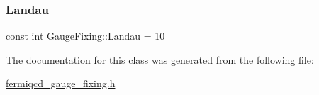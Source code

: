 \mbox{\label{class_gauge_fixing_a115e0b47731237fd9ff984c7f6881994}} 
\subsubsection{\texorpdfstring{Landau}{Landau}}
{\footnotesize\ttfamily const int Gauge\+Fixing\+::\+Landau = 10\hspace{0.3cm}{\ttfamily [static]}}



The documentation for this class was generated from the following file\+:\begin{DoxyCompactItemize}
\item 
\hyperlink{fermiqcd__gauge__fixing_8h}{fermiqcd\+\_\+gauge\+\_\+fixing.\+h}\end{DoxyCompactItemize}
